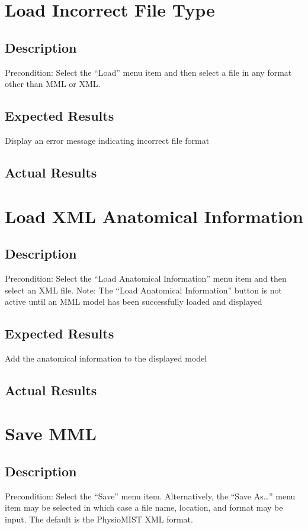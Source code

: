 \documentclass{article}
\begin{document}
\section{Load Incorrect File Type}
\subsection{Description}
Precondition: Select the ``Load'' menu item and then select a file in any format other than MML or XML.
\subsection{Expected Results}
Display an error message indicating incorrect file format
\subsection{Actual Results}

\section{Load XML Anatomical Information}
\subsection{Description}
Precondition: Select the ``Load Anatomical Information'' menu item and then select an XML file.
Note: The ``Load Anatomical Information'' button is not active until an MML model has been successfully loaded and displayed
\subsection{Expected Results}
Add the anatomical information to the displayed model
\subsection{Actual Results}

\section{Save MML}
\subsection{Description}
Precondition: Select the ``Save'' menu item.  Alternatively, the ``Save As\ldots'' menu item may be selected in which case a file name, location, and format may be input.  The default is the PhysioMIST XML format.
\end{document}
